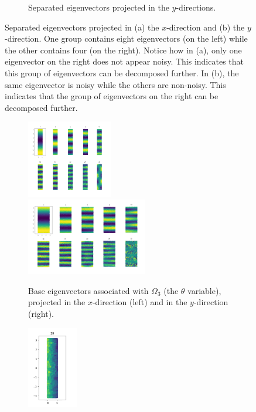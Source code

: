\documentclass{article}
\numberwithin{equation}{section}
\theoremstyle{definition}
\begin{document}
\begin{figure}
\begin{subfigure}[t]{\textwidth}
        \caption{Separated eigenvectors projected in the $y$-directions.}
    \end{subfigure}
    \caption{Separated eigenvectors projected in (a) the $x$-direction and (b) the $y$-direction. One group contains eight eigenvectors (on the left) while the other contains four (on the right). Notice how in (a), only one eigenvector on the right does not appear noisy. This indicates that this group of eigenvectors can be decomposed further. In (b), the same eigenvector is noisy while the others are non-noisy. This indicates that the group of eigenvectors on the right can be decomposed further.}
    \label{fig:3d-2groups}
\end{figure}

\begin{figure} 
    \centering
    \begin{subfigure}[t]{\textwidth}
        \centering
        \includegraphics[width=0.41\textwidth]{images/manifold1_rect_circleA.png}
        \includegraphics[width=0.58\textwidth]{images/manifold1_rect_circleB.png}
        \caption{Base eigenvectors associated with $\Omega_3$ (the $\theta$ variable), projected in the $x$-direction (left) and in the $y$-direction (right).}
    \end{subfigure}
    \begin{subfigure}[t]{\textwidth}
        \centering
        \includegraphics[width=0.24\textwidth]{images/manifold2_rect_circle.png}

\end{subfigure}
\end{figure}
\end{document}
